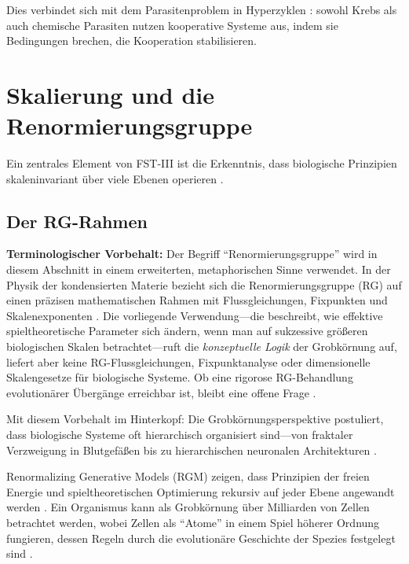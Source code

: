\documentclass[12pt,a4paper]{article}
\theoremstyle{remark}
\begin{document}
Dies verbindet sich mit dem Parasitenproblem in Hyperzyklen \citep{FSTII}: sowohl Krebs als auch chemische Parasiten nutzen kooperative Systeme aus, indem sie Bedingungen brechen, die Kooperation stabilisieren.

\section{Skalierung und die Renormierungsgruppe}
\label{sec:renormalization}

Ein zentrales Element von FST-III ist die Erkenntnis, dass biologische Prinzipien skaleninvariant \"uber viele Ebenen operieren \citep{ScaleRGFrontiers,ScaleRGResearch}.

\subsection{Der RG-Rahmen}

\textbf{Terminologischer Vorbehalt:} Der Begriff ``Renormierungsgruppe'' wird in diesem Abschnitt in einem erweiterten, metaphorischen Sinne verwendet. In der Physik der kondensierten Materie bezieht sich die Renormierungsgruppe (RG) auf einen pr\"azisen mathematischen Rahmen mit Flussgleichungen, Fixpunkten und Skalenexponenten \citep{ScaleRGResearch}. Die vorliegende Verwendung---die beschreibt, wie effektive spieltheoretische Parameter sich \"andern, wenn man auf sukzessive gr\"o\ss{}eren biologischen Skalen betrachtet---ruft die \emph{konzeptuelle Logik} der Grobk\"ornung auf, liefert aber keine RG-Flussgleichungen, Fixpunktanalyse oder dimensionelle Skalengesetze f\"ur biologische Systeme. Ob eine rigorose RG-Behandlung evolution\"arer \"Uberg\"ange erreichbar ist, bleibt eine offene Frage \citep{ScaleRGFrontiers}.

Mit diesem Vorbehalt im Hinterkopf: Die Grobk\"ornungsperspektive postuliert, dass biologische Systeme oft hierarchisch organisiert sind---von fraktaler Verzweigung in Blutgef\"a\ss{}en bis zu hierarchischen neuronalen Architekturen \citep{SelfSimilarNetworks}.

Renormalizing Generative Models (RGM) zeigen, dass Prinzipien der freien Energie und spieltheoretischen Optimierung rekursiv auf jeder Ebene angewandt werden \citep{ScaleRGFrontiers}. Ein Organismus kann als Grobk\"ornung \"uber Milliarden von Zellen betrachtet werden, wobei Zellen als ``Atome'' in einem Spiel h\"oherer Ordnung fungieren, dessen Regeln durch die evolution\"are Geschichte der Spezies festgelegt sind \citep{ReplicatorOptimization}.
\end{document}
